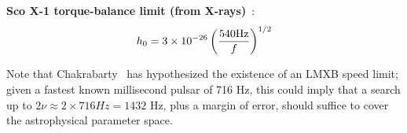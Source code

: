 \textbf{Sco X-1 torque-balance limit (from X-rays)}~\cite{Bildsten1998,GoetzThesis}:
\begin{equation}
h_{0}=3\times10^{-26}\left(\frac{540\textup{Hz}}{f}\right)^{1/2}
\label{ScoX1_torque_bal}
\end{equation}

Note that Chakrabarty~\cite{Chakrabarty2003} has hypothesized the existence of an LMXB speed limit; given a fastest known millisecond pulsar of 716 Hz, this could imply that a search up to $2\nu \approx 2\times716 Hz = 1432$ Hz, plus a margin of error, should suffice to cover the astrophysical parameter space. 








